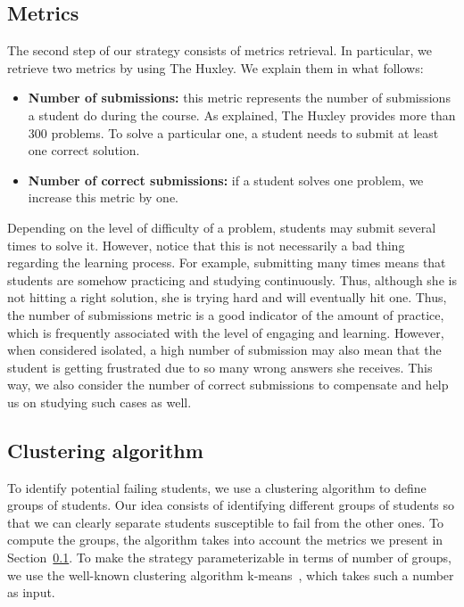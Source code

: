 \subsection{Metrics}

\label{sec:metrics}

The second step of our strategy consists of metrics retrieval. In particular, we retrieve two metrics by using The Huxley. We explain them in what follows:

\begin{itemize}

	\item \textbf{Number of submissions:} this metric represents the number of submissions a student do during the course. As explained, The Huxley provides more than 300 problems. To solve a particular one, a student needs to submit at least one correct solution.

	\item \textbf{Number of correct submissions:} if a student solves one problem, we increase this metric by one.

\end{itemize}

Depending on the level of difficulty of a problem, students may submit several times to solve it. However, notice that this is not necessarily a bad thing regarding the learning process. For example, submitting many times means that students are somehow practicing and studying continuously. Thus, although she is not hitting a right solution, she is trying hard and will eventually hit one. Thus, the number of submissions metric is a good indicator of the amount of practice, which is frequently associated with the level of engaging and learning. However, when considered isolated, a high number of submission may also mean that the student is getting frustrated due to so many wrong answers she receives. This way, we also consider the number of correct submissions to compensate and help us on studying such cases as well.


\subsection{Clustering algorithm}

To identify potential failing students, we use a clustering algorithm to define groups of students. Our idea consists of identifying different groups of students so that we can clearly separate students susceptible to fail from the other ones. To compute the groups, the algorithm takes into account the metrics we present in Section~\ref{sec:metrics}. To make the strategy parameterizable in terms of number of groups, we use the well-known clustering algorithm k-means~\cite{}, which takes such a number as input.

